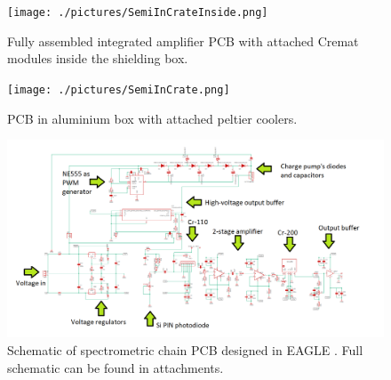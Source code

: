 \begin{figure}[H]
 \centering
 \texttt{[image: ./pictures/SemiInCrateInside.png]}
 \caption{Fully assembled integrated amplifier PCB with attached Cremat modules inside the shielding box.}
 \label{PCBbox}
 
\end{figure}


\begin{figure}[H]
 \centering
 \texttt{[image: ./pictures/SemiInCrate.png]}
 \caption{PCB in aluminium box with attached peltier coolers.}
 \label{PCBphyss}
 
\end{figure}



\newpage

\begin{figure}[H]
 \centering
 \includegraphics[scale=0.5, angle = 90]{./pictures/schemaPopis.png}
 \caption{Schematic of spectrometric chain PCB designed in EAGLE \cite{eagle}. Full schematic can be found in attachments.}
 \label{schematic}
 
\end{figure}

\newpage

